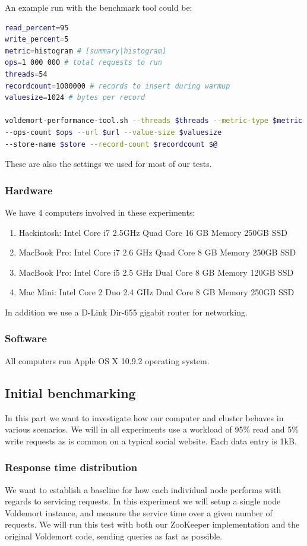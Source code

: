 An example run with the benchmark tool could be:
\begin{lstlisting}[language=bash]
read_percent=95
write_percent=5
metric=histogram # [summary|histogram]
ops=1 000 000 # total requests to run
threads=54
recordcount=1000000 # records to insert during warmup
valuesize=1024 # bytes per record

voldemort-performance-tool.sh --threads $threads --metric-type $metric 
--ops-count $ops --url $url --value-size $valuesize 
--store-name $store --record-count $recordcount $@
\end{lstlisting}

These are also the settings we used for most of our tests.

\subsubsection{Hardware}
We have 4 computers involved in these experiments:

\begin{enumerate}
	\item Hackintosh: Intel Core i7 2.5GHz Quad Core  16 GB Memory 250GB SSD
	\item MacBook Pro: Intel Core i7 2.6 GHz Quad Core 8 GB Memory 250GB SSD
	\item MacBook Pro: Intel Core i5 2.5 GHz Dual Core 8 GB Memory 120GB SSD
	\item Mac Mini: Intel Core 2 Duo 2.4 GHz Dual Core 8 GB Memory 250GB SSD
\end{enumerate}

In addition we use a D-Link Dir-655 gigabit router for networking.

\subsubsection{Software}
All computers run Apple OS X 10.9.2 operating system. 

\subsection{Initial benchmarking}
In this part we want to investigate how our computer and cluster behaves in various scenarios. We will in all experiments use a workload of 95\% read and 5\% write requests as is common on a typical social website. Each data entry is 1kB. 


\subsubsection{Response time distribution}
We want to establish a baseline for how each individual node performs with regards to servicing requests. In this experiment we will setup a single node Voldemort instance, and measure the service time over a given number of requests. We will run this test with both our ZooKeeper implementation and the original Voldemort code, sending queries as fast as possible.

